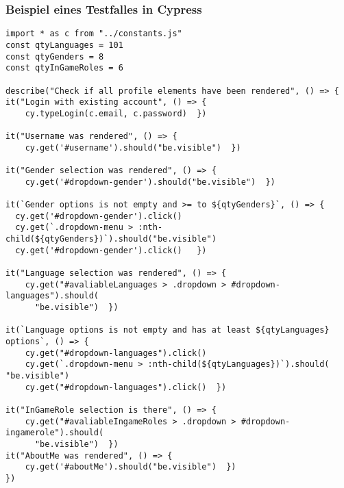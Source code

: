 
\appendix
\renewcommand{\thesubsection}{\Roman{subsection}}
\subsubsection*{Beispiel eines Testfalles in Cypress}\label{Cypress_Code}
\begin{lstlisting} 
import * as c from "../constants.js"
const qtyLanguages = 101
const qtyGenders = 8
const qtyInGameRoles = 6

describe("Check if all profile elements have been rendered", () => {
it("Login with existing account", () => {
    cy.typeLogin(c.email, c.password)  })

it("Username was rendered", () => {
    cy.get('#username').should("be.visible")  })

it("Gender selection was rendered", () => {
    cy.get('#dropdown-gender').should("be.visible")  })

it(`Gender options is not empty and >= to ${qtyGenders}`, () => {
  cy.get('#dropdown-gender').click()
  cy.get(`.dropdown-menu > :nth-child(${qtyGenders})`).should("be.visible")
  cy.get('#dropdown-gender').click()   })

it("Language selection was rendered", () => {
    cy.get("#avaliableLanguages > .dropdown > #dropdown-languages").should(
      "be.visible")  })

it(`Language options is not empty and has at least ${qtyLanguages} options`, () => {
    cy.get("#dropdown-languages").click()
    cy.get(`.dropdown-menu > :nth-child(${qtyLanguages})`).should( "be.visible")
    cy.get("#dropdown-languages").click()  })

it("InGameRole selection is there", () => {
    cy.get("#avaliableIngameRoles > .dropdown > #dropdown-ingamerole").should(
      "be.visible")  })
it("AboutMe was rendered", () => {
    cy.get('#aboutMe').should("be.visible")  })  
})
\end{lstlisting}

